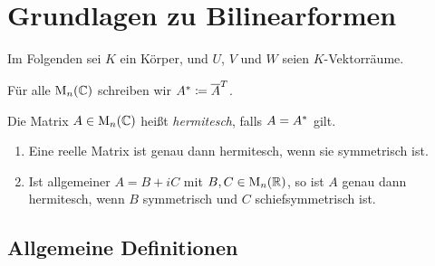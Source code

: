 \chapter{Grundlagen zu Bilinearformen}

Im Folgenden sei $K$ ein Körper, und $U$, $V$ und $W$ seien $K$-Vektorräume.

\begin{notation}
  Für alle $\operatorname{M}_{n}(\mathbb{C})$ schreiben wir $A^* \coloneqq \overline{A}^T$.
\end{notation}

\begin{definition}
  Die Matrix $A \in \operatorname{M}_{n}(\mathbb{C})$ heißt \emph{hermitesch}, falls $A = A^*$ gilt.
\end{definition}

\begin{example}
  \leavevmode
  \begin{enumerate}
    \item
      Eine reelle Matrix ist genau dann hermitesch, wenn sie symmetrisch ist.
    \item
      Ist allgemeiner $A = B + iC$ mit $B, C \in \operatorname{M}_{n}(\mathbb{R})$, so ist $A$ genau dann hermitesch, wenn $B$ symmetrisch und $C$ schiefsymmetrisch ist.
  \end{enumerate}
\end{example}





\section{Allgemeine Definitionen}

